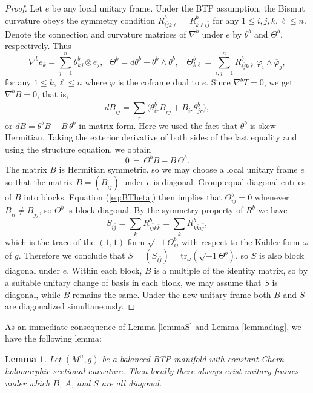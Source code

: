 \documentclass{amsart}
\newtheorem{lemma}{Lemma}
\begin{document}
\begin{proof}
Let $e$ be any local unitary frame. Under the BTP assumption, the Bismut curvature obeys the symmetry condition $R^b_{i\bar{j}k\bar{\ell}} = R^b_{k\bar{\ell}i\bar{j}}$ for any $1\leq i,j,k,\ell \leq n$. Denote the connection and curvature matrices of $\nabla^b$ under $e$ by $\theta^b$ and $\Theta^b$, respectively. Thus
$$ \nabla^be_k = \sum_{j =1}^n \theta^b_{kj} \otimes e_{j}, \ \ \ \Theta^b = d\theta^b - \theta^b \wedge \theta^b, \ \ \ \ \Theta^b_{k\ell } = \sum_{i,j=1}^n R^b_{i\bar{j}k\bar{\ell}} \,\varphi_i \wedge \overline{\varphi}_j, $$
for any $1\leq k, \ell \leq n$ where $\varphi$ is the coframe dual to $e$. Since $\nabla^bT=0$, we get $\nabla^bB=0$, that is,
$$ dB_{i\bar{j}} = \sum_r \big( \theta^b_{ir}B_{r\bar{j}} + B_{i\bar{r}} \overline{\theta^b_{jr}} \big) , $$
or $dB=\theta^bB-B\,\theta^b$ in matrix form. Here we used the fact that  $\theta^b$ is skew-Hermitian. Taking the exterior derivative of both sides of the last equality and using the structure equation, we obtain
\begin{equation} \label{eq:BTheta}
 0 \,= \,\Theta^b B - B \,\Theta^b.
 \end{equation}
The matrix $B$ is Hermitian symmetric, so we may choose a local unitary frame $e$ so that the matrix $B=(B_{i\bar{j}})$ under $e$ is diagonal. Group equal diagonal entries of $B$ into blocks. Equation (\ref{eq:BTheta}) then implies that $\Theta^b_{ij}=0$ whenever $B_{i\bar{i}} \neq B_{j\bar{j}}$, so $\Theta^b$ is block-diagonal. By the symmetry property of $R^b$ we have
$$ S_{i\bar{j}} = \sum_k R^b_{i\bar{j}k\bar{k}} = \sum_k R^b_{k\bar{k}i\bar{j}}, $$
which is the trace of the $(1,1)$-form $\sqrt{-1}\Theta^b_{ij}$ with respect to the K\"ahler form $\omega$ of $g$. Therefore we conclude that $S=(S_{i\bar{j}})= \mbox{tr}_{\omega}(\sqrt{-1}\Theta^b)$, so $S$ is also block diagonal under $e$. Within each block, $B$ is a multiple of the identity matrix, so by a suitable unitary change of basis in each block, we may assume that $S$ is diagonal, while $B$ remains the same. Under the new unitary frame both $B$ and $S$ are diagonalized simultaneously.
\end{proof}

As an immediate consequence of Lemma \ref{lemmaS} and Lemma \ref{lemmadiag}, we have the following lemma:

\begin{lemma} \label{lemmadiag3}
Let $(M^n,g)$ be a balanced BTP manifold with constant Chern holomorphic sectional curvature. Then locally there always exist unitary frames under which $B$, $A$, and $S$ are all diagonal.
\end{lemma}
\end{document}

